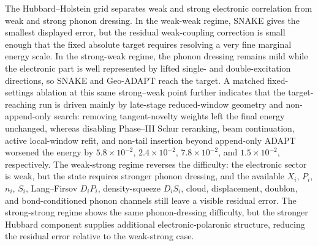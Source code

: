 \documentclass[
  reprint,
  amsmath,
  amssymb,
  aps,
  pra,
  nofootinbib,
  superscriptaddress,
  floatfix
]{revtex4-2}
\begin{document}
\begin{widetext}
The Hubbard--Holstein grid separates weak and strong electronic correlation from weak and strong phonon dressing. In the weak-weak regime, SNAKE gives the smallest displayed error, but the residual weak-coupling correction is small enough that the fixed absolute target requires resolving a very fine marginal energy scale. In the strong-weak regime, the phonon dressing remains mild while the electronic part is well represented by lifted single- and double-excitation directions, so SNAKE and Geo-ADAPT reach the target. A matched fixed-settings ablation at this same strong--weak point further indicates that the target-reaching run is driven mainly by late-stage reduced-window geometry and non-append-only search: removing tangent-novelty weights left the final energy unchanged, whereas disabling Phase--III Schur reranking, beam continuation, active local-window refit, and non-tail insertion beyond append-only ADAPT worsened the energy by \(5.8\times 10^{-2}\), \(2.4\times 10^{-2}\), \(7.8\times 10^{-2}\), and \(1.5\times 10^{-2}\), respectively. The weak-strong regime reverses the difficulty: the electronic sector is weak, but the state requires stronger phonon dressing, and the available \(X_i\), \(P_i\), \(n_i\), \(S_i\), Lang--Firsov \(D_iP_i\), density-squeeze \(D_iS_i\), cloud, displacement, doublon, and bond-conditioned phonon channels still leave a visible residual error. The strong-strong regime shows the same phonon-dressing difficulty, but the stronger Hubbard component supplies additional electronic-polaronic structure, reducing the residual error relative to the weak-strong case.


\end{widetext}
\end{document}
